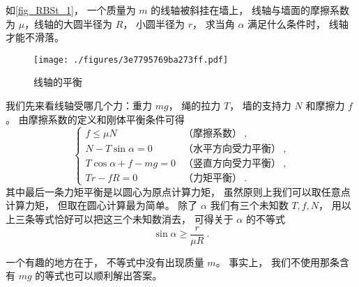 \begin{example}{}\label{ex_RBSt_1}
如\autoref{fig_RBSt_1}， 一个质量为 $m$ 的线轴被斜挂在墙上， 线轴与墙面的摩擦系数为 $\mu$，线轴的大圆半径为 $R$， 小圆半径为 $r$， 求当角 $\alpha$ 满足什么条件时， 线轴才能不滑落。
\begin{figure}[ht]
\centering
\texttt{[image: ./figures/3e7795769ba273ff.pdf]}
\caption{线轴的平衡} \label{fig_RBSt_1}
\end{figure}

我们先来看线轴受哪几个力：重力 $mg$， 绳的拉力 $T$， 墙的支持力 $N$ 和摩擦力 $f$。 由摩擦系数的定义和刚体平衡条件可得
\begin{equation}
\begin{cases}
f \leqslant \mu N & \text{（摩擦系数）}~,\\
N - T\sin\alpha = 0 & \text{（水平方向受力平衡）}~,\\
T\cos\alpha + f - mg = 0 & \text{（竖直方向受力平衡）}~,\\
Tr - fR = 0 & \text{（力矩平衡）}~.
\end{cases}
\end{equation}
其中最后一条力矩平衡是以圆心为原点计算力矩， 虽然原则上我们可以取任意点计算力矩， 但取在圆心计算最为简单。 除了 $\alpha$ 我们有三个未知数 $T, f, N$， 用以上三条等式恰好可以把这三个未知数消去， 可得关于 $\alpha$ 的不等式
\begin{equation}
\sin\alpha \geqslant \frac{r}{\mu R}~.
\end{equation}

一个有趣的地方在于， 不等式中没有出现质量 $m$。 事实上， 我们不使用那条含有 $mg$ 的等式也可以顺利解出答案。
\end{example}


